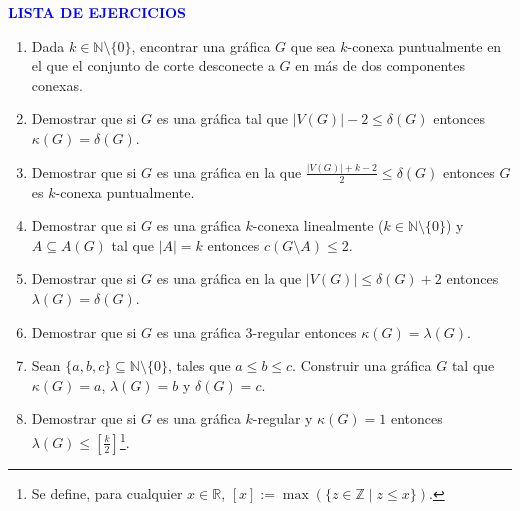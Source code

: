 \documentclass[10pt]{report}
\numberwithin{section}{chapter}
\newcommand{\N}{\mathbb N}
\newcommand{\Z}{\mathbb Z}
\newcommand{\R}{\mathbb R}
\begin{document}
\vspace{1cm}


\begin{center}
\textcolor{blue}{\textbf{\large LISTA DE EJERCICIOS}}
\end{center}


\begin{enumerate}
\item Dada $k \in \N \setminus \{0\}$, encontrar una gráfica $G$ que sea $k$-conexa puntualmente en el que el conjunto de corte desconecte a $G$ en más de dos componentes conexas.

\item Demostrar que si $G$ es una gráfica tal que $|V(G)|-2 \leq \delta(G)$ entonces $\kappa(G) = \delta(G)$.

\item Demostrar que si $G$ es una gráfica en la que $\frac{|V(G)|+k-2}{2} \leq \delta(G)$ entonces $G$ es $k$-conexa puntualmente.


\item Demostrar que si $G$ es una gráfica $k$-conexa linealmente ($k \in \N \setminus \{0\}$) y $A \subseteq A(G)$ tal que $|A| =k$ entonces $c(G\setminus A) \leq 2$.


\item Demostrar que si $G$ es una gráfica en la que $|V(G)| \leq \delta(G)+2$ entonces $\lambda(G) = \delta(G)$.


\item Demostrar que si $G$ es una gráfica $3$-regular entonces $\kappa(G) = \lambda(G)$.

\item Sean $\{a,b,c\} \subseteq \N \setminus \{0\}$, tales que $a \leq b \leq c$. Construir una gráfica $G$ tal que $\kappa(G) =a$, $\lambda (G) = b$ y $\delta(G) =c$.


\item Demostrar que si $G$ es una gráfica $k$-regular y $\kappa(G)=1$ entonces $\lambda(G) \leq \left[ \frac{k}{2}\right]$\footnote{Se define, para cualquier $x \in \R$, $[x] := \max(\{z \in \Z \; | \; z \leq x\})$.}.


\end{enumerate}
\end{document}
